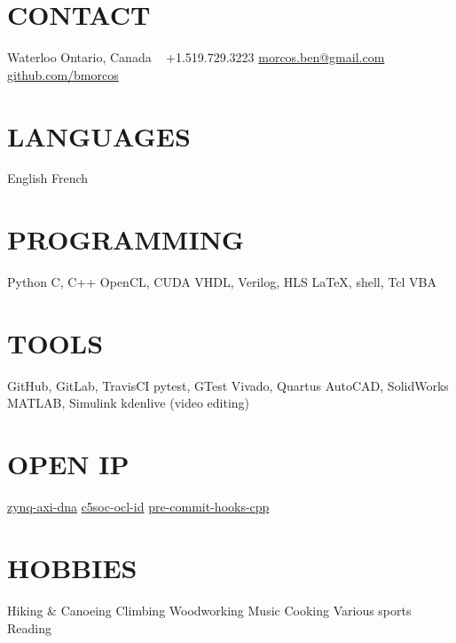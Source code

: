 \documentclass[a4paper,nocolors]{cv-friggeri-ben}
\begin{document}


\begin{aside} %
    \section{CONTACT}
    \hfill Waterloo
    \hfill Ontario, Canada
    ~
    \hfill +1.519.729.3223
    \hfill \href{mailto:morcos.ben@gmail.com}{morcos.ben@gmail.com}
    ~
    \hfill \href{https://github.com/bmorcos}{github.com/bmorcos}
    \section{LANGUAGES}
    English
    French
    \section{PROGRAMMING}
    Python
    C, C++
    OpenCL, CUDA
    VHDL, Verilog, HLS
    \LaTeX, shell, Tcl
    VBA
    \section{TOOLS}
    GitHub, GitLab, TravisCI
    pytest, GTest
    Vivado, Quartus
    AutoCAD, SolidWorks
    MATLAB, Simulink
    kdenlive (video editing)
    \section{OPEN IP}
    \href{https://github.com/abr/zynq-axi-dna}{zynq-axi-dna}
    \href{https://github.com/abr/c5soc-ocl-id}{c5soc-ocl-id}
    \href{https://github.com/bmorcos/pre-commit-hooks-cpp}{pre-commit-hooks-cpp}
    \section{HOBBIES}
    Hiking \& Canoeing
    Climbing
    Woodworking
    Music
    Cooking
    Various sports
    Reading
\end{aside}


\end{document}
